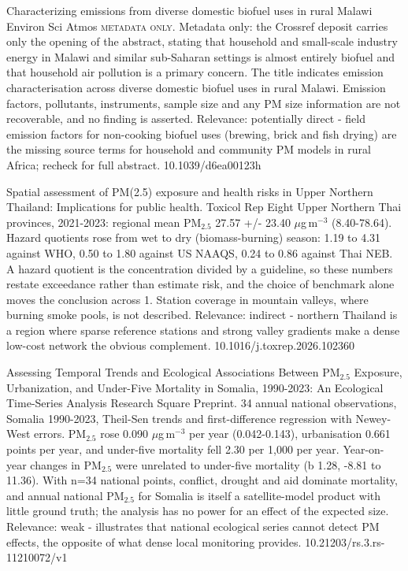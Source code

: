 \documentclass[10pt]{article}
\begin{document}
{Characterizing emissions from diverse domestic biofuel uses in rural Malawi}
{Environ Sci Atmos}
{\textsc{metadata only.} Metadata only: the Crossref deposit carries only the opening of the abstract, stating that household and small-scale industry energy in Malawi and similar sub-Saharan settings is almost entirely biofuel and that household air pollution is a primary concern. The title indicates emission characterisation across diverse domestic biofuel uses in rural Malawi. Emission factors, pollutants, instruments, sample size and any PM size information are not recoverable, and no finding is asserted. Relevance: potentially direct - field emission factors for non-cooking biofuel uses (brewing, brick and fish drying) are the missing source terms for household and community PM models in rural Africa; recheck for full abstract.}
{10.1039/d6ea00123h}

\par{}\baselineskip{}\baselineskip
{}

{Spatial assessment of PM(2.5) exposure and health risks in Upper Northern Thailand: Implications for public health.}
{Toxicol Rep}
{Eight Upper Northern Thai provinces, 2021-2023: regional mean PM$_{2.5}$ 27.57 +/- 23.40 $\mu$g\,m$^{-3}$ (8.40-78.64). Hazard quotients rose from wet to dry (biomass-burning) season: 1.19 to 4.31 against WHO, 0.50 to 1.80 against US NAAQS, 0.24 to 0.86 against Thai NEB. A hazard quotient is the concentration divided by a guideline, so these numbers restate exceedance rather than estimate risk, and the choice of benchmark alone moves the conclusion across 1. Station coverage in mountain valleys, where burning smoke pools, is not described. Relevance: indirect - northern Thailand is a region where sparse reference stations and strong valley gradients make a dense low-cost network the obvious complement.}
{10.1016/j.toxrep.2026.102360}

{Assessing Temporal Trends and Ecological Associations Between PM$_{2.5}$ Exposure, Urbanization, and Under-Five Mortality in Somalia, 1990-2023: An Ecological Time-Series Analysis}
{Research Square}
{Preprint. 34 annual national observations, Somalia 1990-2023, Theil-Sen trends and first-difference regression with Newey-West errors. PM$_{2.5}$ rose 0.090 $\mu$g\,m$^{-3}$ per year (0.042-0.143), urbanisation 0.661 points per year, and under-five mortality fell 2.30 per 1,000 per year. Year-on-year changes in PM$_{2.5}$ were unrelated to under-five mortality (b 1.28, -8.81 to 11.36). With n=34 national points, conflict, drought and aid dominate mortality, and annual national PM$_{2.5}$ for Somalia is itself a satellite-model product with little ground truth; the analysis has no power for an effect of the expected size. Relevance: weak - illustrates that national ecological series cannot detect PM effects, the opposite of what dense local monitoring provides.}
{10.21203/rs.3.rs-11210072/v1}
\end{document}

